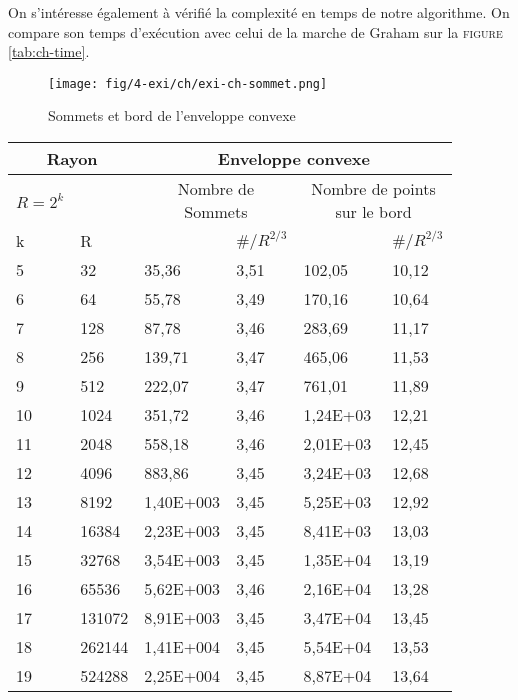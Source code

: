 On s'intéresse également à vérifié la complexité en temps de notre algorithme. On compare son temps d'exécution avec celui de la marche de Graham sur la \textsc{figure} \ref{tab:ch-time}. 

\begin{figure}[H]
  \centering
  \texttt{[image: fig/4-exi/ch/exi-ch-sommet.png]}
  \caption{Sommets et bord de l'enveloppe convexe}
  \label{fig:ch} 
\end{figure}

\begin{table}[H]
  \begin{tabular}{|p{0.09\linewidth}|p{0.13\linewidth}||p{0.2\linewidth}|p{0.13\linewidth}||p{0.2\linewidth}|p{0.13\linewidth}|}
    \hline
    \multicolumn{2}{|c||}{Rayon} & \multicolumn{4}{c|}{Enveloppe convexe} \\  \hline 
    $R=2^k$  &  & \multicolumn{2}{c||}{Nombre de Sommets} &  \multicolumn{2}{c|}{Nombre de points sur le bord} \\ \hline 
    k & R &   & $\# / R^{2/3}$  &   & $\# / R^{2/3}$ \\    
    \hline
    5 & 32         & 35,36     & 3,51 & 102,05   &  10,12\\
    6 & 64         & 55,78     & 3,49 & 170,16   &  10,64\\
    7 & 128        & 87,78     & 3,46 & 283,69   &  11,17\\
    8 & 256        & 139,71    & 3,47 & 465,06   &  11,53\\
    9 & 512        & 222,07    & 3,47 & 761,01   &  11,89\\
    10 & 1024      & 351,72    & 3,46 & 1,24E+03 &  12,21\\
    11 & 2048      & 558,18    & 3,46 & 2,01E+03 &  12,45\\
    12 & 4096      & 883,86    & 3,45 & 3,24E+03 &  12,68\\
    13 & 8192      & 1,40E+003 & 3,45 & 5,25E+03 &  12,92\\
    14 & 16384     & 2,23E+003 & 3,45 & 8,41E+03 &  13,03\\
    15 & 32768     & 3,54E+003 & 3,45 & 1,35E+04 &  13,19\\
    16 & 65536     & 5,62E+003 & 3,46 & 2,16E+04 &  13,28\\
    17 & 131072    & 8,91E+003 & 3,45 & 3,47E+04 &  13,45\\
    18 & 262144    & 1,41E+004 & 3,45 & 5,54E+04 &  13,53\\
    19 & 524288    & 2,25E+004 & 3,45 & 8,87E+04 &  13,64\\

\end{tabular}
\end{table}
